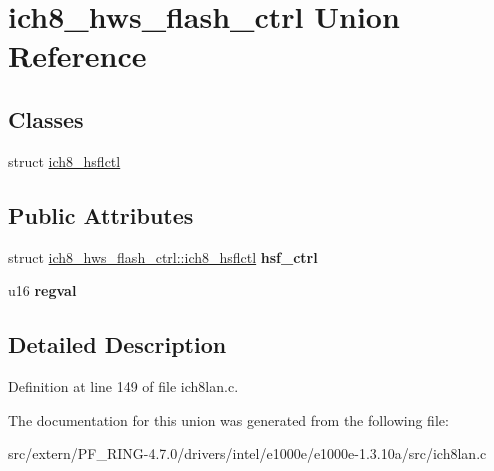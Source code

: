 \hypertarget{unionich8__hws__flash__ctrl}{
\section{ich8\_\-hws\_\-flash\_\-ctrl Union Reference}
\label{unionich8__hws__flash__ctrl}
}
\subsection*{Classes}
\begin{DoxyCompactItemize}
\item 
struct \hyperlink{structich8__hws__flash__ctrl_1_1ich8__hsflctl}{ich8\_\-hsflctl}
\end{DoxyCompactItemize}
\subsection*{Public Attributes}
\begin{DoxyCompactItemize}
\item 
\hypertarget{unionich8__hws__flash__ctrl_aa53dad5ebc7f1ed29b41cd68616ac468}{
struct \hyperlink{structich8__hws__flash__ctrl_1_1ich8__hsflctl}{ich8\_\-hws\_\-flash\_\-ctrl::ich8\_\-hsflctl} {\bfseries hsf\_\-ctrl}}
\label{unionich8__hws__flash__ctrl_aa53dad5ebc7f1ed29b41cd68616ac468}

\item 
\hypertarget{unionich8__hws__flash__ctrl_a8730e18a265c5066abc8049136a27a1b}{
u16 {\bfseries regval}}
\label{unionich8__hws__flash__ctrl_a8730e18a265c5066abc8049136a27a1b}

\end{DoxyCompactItemize}


\subsection{Detailed Description}


Definition at line 149 of file ich8lan.c.



The documentation for this union was generated from the following file:\begin{DoxyCompactItemize}
\item 
src/extern/PF\_\-RING-\/4.7.0/drivers/intel/e1000e/e1000e-\/1.3.10a/src/ich8lan.c\end{DoxyCompactItemize}
